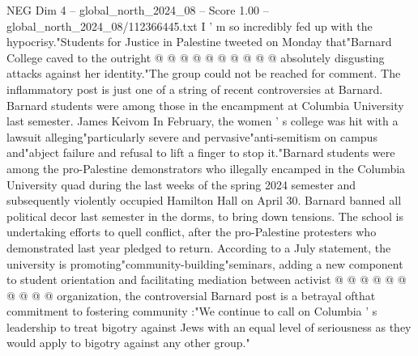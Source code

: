 \begin{textsample}{NEG Dim 4 – global\_north\_2024\_08 – Score 1.00 – global\_north\_2024\_08/112366445.txt}
I ' m so incredibly fed up with the hypocrisy."Students for Justice in Palestine tweeted on Monday that"Barnard College caved to the outright @ @ @ @ @ @ @ @ @ @ absolutely disgusting attacks against her identity."The group could not be reached for comment.
The inflammatory post is just one of a string of recent controversies at Barnard.
Barnard students were among those in the encampment at Columbia University last semester.
James Keivom In February, the women ' s college was hit with a lawsuit alleging"particularly severe and pervasive"anti-semitism on campus and"abject failure and refusal to lift a finger to stop it."Barnard students were among the pro-Palestine demonstrators who illegally encamped in the Columbia University quad during the last weeks of the spring 2024 semester and subsequently violently occupied Hamilton Hall on April 30.
Barnard banned all political decor last semester in the dorms, to bring down tensions.
The school is undertaking efforts to quell conflict, after the pro-Palestine protesters who demonstrated last year pledged to return.
According to a July statement, the university is promoting"community-building"seminars, adding a new component to student orientation and facilitating mediation between activist @ @ @ @ @ @ @ @ @ @ organization, the controversial Barnard post is a betrayal ofthat commitment to fostering community :"We continue to call on Columbia ' s leadership to treat bigotry against Jews with an equal level of seriousness as they would apply to bigotry against any other group."

\end{textsample}
